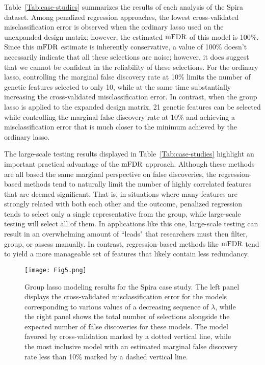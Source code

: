 Table~\ref{Tab:case-studies} summarizes the results of each analysis of the Spira dataset. Among penalized regression approaches, the lowest cross-validated misclassification error is observed when the ordinary lasso used on the unexpanded design matrix; however, the estimated $\textrm{mFDR}$ of this model is 100\%. Since this $\textrm{mFDR}$ estimate is inherently conservative, a value of 100\% doesn't necessarily indicate that all these selections are noise; however, it does suggest that we cannot be confident in the reliability of these selections. For the ordinary lasso, controlling the marginal false discovery rate at 10\% limits the number of genetic features selected to only 10, while at the same time substantially increasing the cross-validated misclassification error. In contrast, when the group lasso is applied to the expanded design matrix, 21 genetic features can be selected while controlling the marginal false discovery rate at 10\% and achieving a misclassification error that is much closer to the minimum achieved by the ordinary lasso. 

The large-scale testing results displayed in Table~\ref{Tab:case-studies} highlight an important practical advantage of the $\textrm{mFDR}$ approach. Although these methods are all based the same marginal perspective on false discoveries, the regression-based methods tend to naturally limit the number of highly correlated features that are deemed significant.  That is, in situations where many features are strongly related with both each other and the outcome, penalized regression tends to select only a single representative from the group, while large-scale testing will select all of them. In applications like this one, large-scale testing can result in an overwhelming amount of ``leads" that researchers must then filter, group, or assess manually.  In contrast, regression-based methods like $\textrm{mFDR}$ tend to yield a more manageable set of features that likely contain less redundancy. 

\begin{figure} [!htb]
\centering
\texttt{[image: Fig5.png]}
\caption{\label{Fig:casestudy} Group lasso modeling results for the Spira case study. The left panel displays the cross-validated misclassification error for the models corresponding to various values of a decreasing sequence of $\lambda$, while the right panel shows the total number of selections alongside the expected number of false discoveries for these models. The model favored by cross-validation marked by a dotted vertical line, while the most inclusive model with an estimated marginal false discovery rate less than 10\% marked by a dashed vertical line. }
\end{figure}


